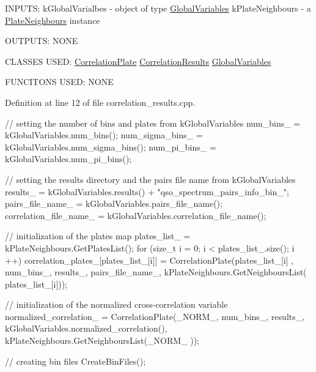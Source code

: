 I\-N\-P\-U\-T\-S\-: k\-Global\-Varialbes -\/ object of type \hyperlink{class_global_variables}{Global\-Variables} k\-Plate\-Neighbours -\/ a \hyperlink{class_plate_neighbours}{Plate\-Neighbours} instance

O\-U\-T\-P\-U\-T\-S\-: N\-O\-N\-E

C\-L\-A\-S\-S\-E\-S U\-S\-E\-D\-: \hyperlink{class_correlation_plate}{Correlation\-Plate} \hyperlink{class_correlation_results}{Correlation\-Results} \hyperlink{class_global_variables}{Global\-Variables}

F\-U\-N\-C\-I\-T\-O\-N\-S U\-S\-E\-D\-: N\-O\-N\-E

Definition at line 12 of file correlation\-\_\-results.\-cpp.


\begin{DoxyCode}
                                                                               
                                             {
    // setting the number of bins and plates from kGlobalVariables
    num_bins_ = kGlobalVariables.num_bins();
    num_sigma_bins_ = kGlobalVariables.num_sigma_bins();
    num_pi_bins_ = kGlobalVariables.num_pi_bins();
    
    // setting the results directory and the pairs file name from
       kGlobalVariables
    results_ = kGlobalVariables.results() + "qso_spectrum_pairs_info_bin_";
    pairs_file_name_ = kGlobalVariables.pairs_file_name();
    correlation_file_name_ = kGlobalVariables.correlation_file_name();
    
    // initialization of the plates map
    plates_list_ = kPlateNeighbours.GetPlatesList();
    for (size_t i = 0; i < plates_list_.size(); i ++){
        correlation_plates_[plates_list_[i]] = CorrelationPlate(plates_list_[i]
      , num_bins_, results_, pairs_file_name_, kPlateNeighbours.GetNeighboursList(
      plates_list_[i]));
    }
    
    // initialization of the normalized cross-correlation variable
    normalized_correlation_ = CorrelationPlate(_NORM_, num_bins_, results_, 
      kGlobalVariables.normalized_correlation(), kPlateNeighbours.GetNeighboursList(_NORM_
      ));
    
    // creating bin files
    CreateBinFiles();
}
\end{DoxyCode}


